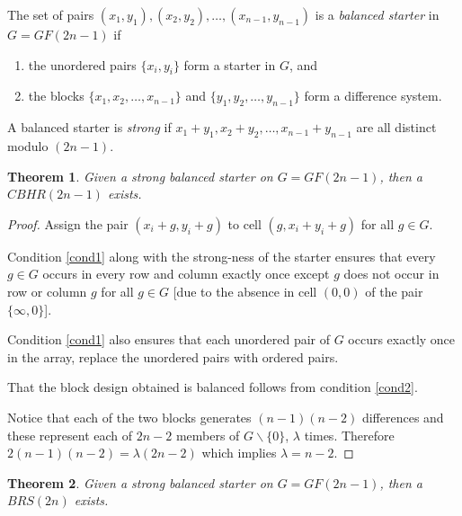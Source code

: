 \documentclass[
  11pt,
  a4paper]{book}
\newtheorem{theorem}{Theorem}
\begin{document}
The set of pairs
\((x_1, y_1), (x_2, y_2), \ldots, (x_{n - 1}, y_{n - 1})\) is a
\emph{balanced starter} in \(G = GF(2n - 1)\) if

\begin{enumerate}
  \item{the unordered pairs $\{x_i, y_i\}$ form a starter in
    $G$, and} \label{cond1}
  \item{the blocks $\{x_1, x_2, \ldots, x_{n - 1}\}$ and
    $\{y_1, y_2, \ldots, y_{n - 1}\}$ form a difference system.} \label{cond2}
\end{enumerate}

A balanced starter is \emph{strong} if
\(x_1 + y_1, x_2 + y_2, \ldots, x_{n - 1} + y_{n - 1}\) are all distinct
modulo \((2n - 1)\).

\begin{theorem}
Given a strong balanced starter on $G = GF(2n - 1)$, then
a $CBHR(2n - 1)$ exists.
\end{theorem}

\begin{proof}
Assign the pair $(x_i + g, y_i + g)$ to cell
$(g, x_i + y_i + g)$ for all $g \in G$.

Condition \ref{cond1} along with the strong-ness of
the starter ensures that every $g \in G$ occurs in every row
and column exactly once except $g$ does not occur in row or
column $g$ for all $g \in G$ [due to the absence in cell
$(0, 0)$ of the pair $\{\infty, 0\}$].

Condition \ref{cond1} also ensures that each unordered pair of $G$
occurs exactly once in the array, replace the unordered
pairs with ordered pairs.

That the block design obtained is balanced follows
from condition \ref{cond2}.

Notice that each of the two blocks
generates $(n - 1)(n - 2)$ differences and these represent each
of $2n - 2$ members of $G \backslash \{0\}$, $\lambda$ times.
Therefore $2(n - 1)(n - 2) = \lambda (2n - 2)$ which implies
$\lambda = n - 2$.
\end{proof}

\begin{theorem}
Given a strong balanced starter on $G = GF(2n - 1)$, then a
$BRS(2n)$ exists.
\end{theorem}
\end{document}
